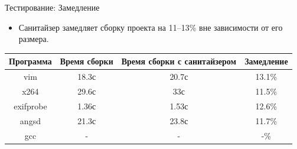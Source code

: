     \begin{frame}{Тестирование: Замедление}
        \begin{itemize}
            \item Санитайзер замедляет сборку проекта на 11--13\% вне зависимости от его размера.
        \end{itemize}

        \begin{tabular}{cccc}
            \toprule
            Программа & Время сборки & Время сборки с санитайзером & Замедление \\
            \midrule
            vim & 18.3с & 20.7с & 13.1\% \\
            x264 & 29.6с & 33с & 11.5\% \\
            exifprobe & 1.36с & 1.53с & 12.6\% \\
            angsd & 21.3с & 23.8с & 11.7\% \\
            gcc & - & - & -\% \\
            \bottomrule
        \end{tabular}

    \end{frame}

